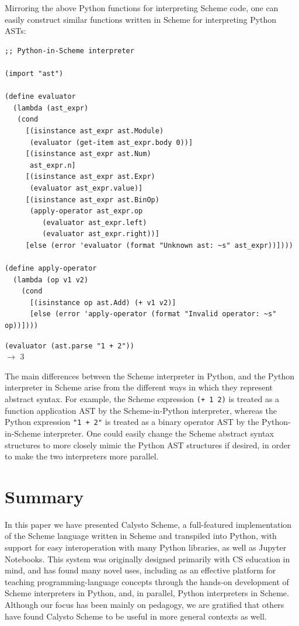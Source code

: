 \documentclass[acmsmall,screen,authorversion]{acmart}
\begin{document}
Mirroring the above Python functions for interpreting Scheme code, one can
easily construct similar functions written in Scheme for interpreting Python
ASTs:\\

\begin{minipage}{\textwidth}
{\small
\begin{verbatim}
;; Python-in-Scheme interpreter

(import "ast")

(define evaluator
  (lambda (ast_expr)
   (cond
     [(isinstance ast_expr ast.Module)
      (evaluator (get-item ast_expr.body 0))]
     [(isinstance ast_expr ast.Num)
      ast_expr.n]
     [(isinstance ast_expr ast.Expr)
      (evaluator ast_expr.value)]
     [(isinstance ast_expr ast.BinOp)
      (apply-operator ast_expr.op
         (evaluator ast_expr.left)
         (evaluator ast_expr.right))]
     [else (error 'evaluator (format "Unknown ast: ~s" ast_expr))])))

(define apply-operator
  (lambda (op v1 v2)
    (cond
      [(isinstance op ast.Add) (+ v1 v2)]
      [else (error 'apply-operator (format "Invalid operator: ~s" op))])))

\end{verbatim}
\texttt{(evaluator (ast.parse "1 + 2"))}\\
$\rightarrow$ 3\\
}
\end{minipage}

\noindent
The main differences between the Scheme interpreter in Python, and the Python
interpreter in Scheme arise from the different ways in which they represent
abstract syntax.  For example, the Scheme expression \texttt{(+~1~2)} is
treated as a function application AST by the Scheme-in-Python interpreter,
whereas the Python expression \texttt{"1~+~2"} is treated as a binary operator
AST by the Python-in-Scheme interpreter.  One could easily change the Scheme
abstract syntax structures to more closely mimic the Python AST structures if
desired, in order to make the two interpreters more parallel.

\section{Summary}

In this paper we have presented Calysto Scheme, a full-featured implementation
of the Scheme language written in Scheme and transpiled into Python, with
support for easy interoperation with many Python libraries, as well as Jupyter
Notebooks. This system was originally designed primarily with CS education in
mind, and has found many novel uses, including as an effective platform for
teaching programming-language concepts through the hands-on development of
Scheme interpreters in Python, and, in parallel, Python interpreters in
Scheme. Although our focus has been mainly on pedagogy, we are gratified that
others have found Calysto Scheme to be useful in more general contexts as well.
\end{document}
